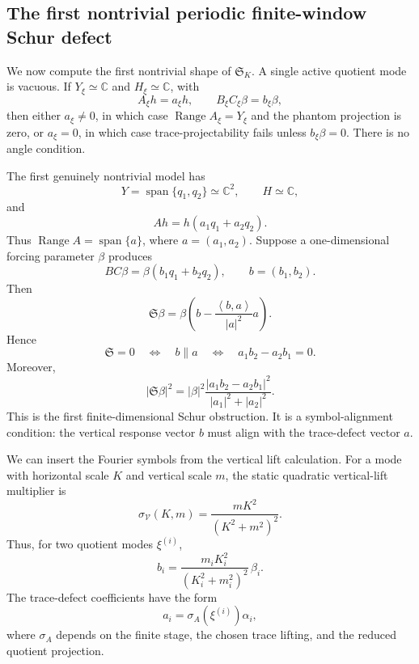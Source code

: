 \documentclass[11pt]{article}
\numberwithin{equation}{section}
\DeclareMathOperator{\Range}{Range}
\newcommand{\ip}[2]{\left\langle #1,#2\right\rangle}
\newcommand{\calV}{\mathcal V}
\begin{document}
\subsection{The first nontrivial periodic finite-window Schur defect}\label{subsec:first-schur-defect}

We now compute the first nontrivial shape of \(\mathfrak S_K\).  A single active quotient mode is vacuous.  If \(Y_\xi\simeq\mathbb C\) and \(H_\xi\simeq\mathbb C\), with
\[
        A_\xi h=a_\xi h,
        \qquad B_\xi C_\xi\beta=b_\xi\beta,
\]
then either \(a_\xi\ne0\), in which case \(\Range A_\xi=Y_\xi\) and the phantom projection is zero, or \(a_\xi=0\), in which case trace-projectability fails unless \(b_\xi\beta=0\).  There is no angle condition.

The first genuinely nontrivial model has
\[
        Y=\operatorname{span}\{q_1,q_2\}\simeq\mathbb C^2,
        \qquad H\simeq\mathbb C,
\]
and
\[
        Ah=h(a_1q_1+a_2q_2).
\]
Thus \(\Range A=\operatorname{span}\{a\}\), where \(a=(a_1,a_2)\).  Suppose a one-dimensional forcing parameter \(\beta\) produces
\[
        BC\beta=\beta(b_1q_1+b_2q_2),
        \qquad b=(b_1,b_2).
\]
Then
\begin{equation}\label{eq:first-Schur-projection}
        \mathfrak S\beta
        =\beta\left(b-\frac{\ip{b}{a}}{|a|^2}a\right).
\end{equation}
Hence
\begin{equation}\label{eq:first-Schur-determinant}
        \mathfrak S=0
        \quad\Longleftrightarrow\quad
        b\parallel a
        \quad\Longleftrightarrow\quad
        a_1b_2-a_2b_1=0.
\end{equation}
Moreover,
\begin{equation}\label{eq:first-Schur-size}
        |\mathfrak S\beta|^2
        =|\beta|^2
        \frac{|a_1b_2-a_2b_1|^2}{|a_1|^2+|a_2|^2}.
\end{equation}
This is the first finite-dimensional Schur obstruction.  It is a symbol-alignment condition: the vertical response vector \(b\) must align with the trace-defect vector \(a\).

We can insert the Fourier symbols from the vertical lift calculation.  For a mode with horizontal scale \(K\) and vertical scale \(m\), the static quadratic vertical-lift multiplier is
\begin{equation}\label{eq:sigmaV-again}
        \sigma_{\calV}(K,m)
        =\frac{mK^2}{(K^2+m^2)^2}.
\end{equation}
Thus, for two quotient modes \(\xi^{(i)}\),
\[
        b_i=\frac{m_iK_i^2}{(K_i^2+m_i^2)^2}\,\beta_i.
\]
The trace-defect coefficients have the form
\[
        a_i=\sigma_A(\xi^{(i)})\alpha_i,
\]
where \(\sigma_A\) depends on the finite stage, the chosen trace lifting, and the reduced quotient projection.
\end{document}
